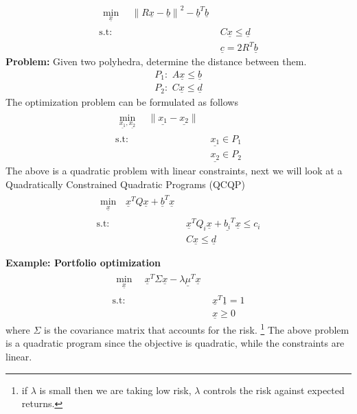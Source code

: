 \documentclass{tufte-handout}
\theoremstyle{remark}
\renewcommand{\vec}[1]{\underline{#1}}
\newcommand\norm[1]{\ensuremath{\lVert#1\rVert}}
\newcommand\twospace{\,\,}
\begin{document}
\begin{align}
    \begin{split}
        \min_{\vec{x}}\, &\twospace\norm{R\vec{x}-\vec{b}}^2-\vec{b}^T\vec{b}
    \end{split}\\ 
    \text{s.t:}
    \twospace & C\vec{x} \leq \vec{d}\\
    & \vec{c} = 2R^T\vec{b} \nonumber
\end{align}
\textbf{Problem:} Given two polyhedra, determine the distance between them.
\begin{align}
    P_1:\twospace A\vec{x}\leq\vec{b}\\
    P_2:\twospace C\vec{x}\leq\vec{d}
\end{align}
The optimization problem can be formulated as follows
\begin{align}
    \begin{split}
        \min_{\vec{x_1},\vec{x_2}}\, &\twospace\norm{\vec{x_1}-\vec{x_2}}
    \end{split}\\ 
    \text{s.t:}
    \twospace & \vec{x_1} \in P_1\\
    & \vec{x_2} \in P_2 \nonumber
\end{align}
The above is a quadratic problem with linear constraints, next we will look at a Quadratically Constrained Quadratic Programs (QCQP)
\begin{align}
    \begin{split}
        \min_{\vec{x}}\, &\vec{x}^TQ\vec{x}+\vec{b}^T\vec{x}
    \end{split}\\ 
    \text{s.t:}
    \twospace & \vec{x}^TQ_i\vec{x}+\vec{b_i}^T\vec{x}\leq c_i\\
    & C\vec{x}\leq\vec{d} \nonumber
\end{align}

\textbf{Example: Portfolio optimization}
\begin{align}
    \begin{split}
        \min_{\vec{x}}\, &\twospace\vec{x}^T\Sigma\vec{x}-\lambda\vec{\mu}^T\vec{x}
    \end{split}\\ 
    \text{s.t:}
    \twospace & \vec{x}^T\vec{1} = 1\\
    & \vec{x}\geq 0 \nonumber
\end{align}
where $\Sigma$ is the covariance matrix that accounts for the risk.
\footnote{if $\lambda$ is small then we are taking low risk, $\lambda$ controls the risk against expected returns.}
The above problem is a quadratic program since the objective is quadratic, while the constraints are linear.
\end{document}
